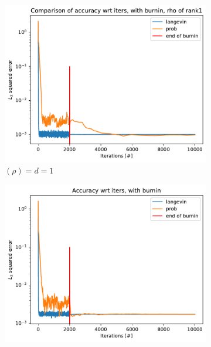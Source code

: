 \documentclass[12pt]{memoir}
\newcommand{\rhorankn}[1]{\text{rank}$(\rho)=#1$}
\begin{document}
\begin{figure}[H]

    \centering

    \begin{subfigure}[b]{0.49\textwidth}


        \centering

        \includegraphics[width=\textwidth]{figures/experiments/baseline/diff_rank/iters_acc_comp_iters_no_avg_rank1-1.png}

        \caption{\rhorankn{d=1}}

        \label{fig:conv-plot-diff-rank-1-sub}

    \end{subfigure}
    \hfill
    \begin{subfigure}[b]{0.49\textwidth}


        \centering

        \includegraphics[width=\textwidth]{figures/experiments/baseline/diff_rank/iters_acc_comp_iters_no_avg-1.png}


\end{subfigure}
\end{figure}
\end{document}

